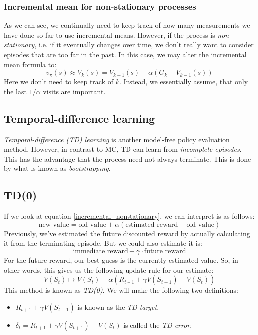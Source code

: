 \documentclass[12pt, a4paper]{article}
\numberwithin{equation}{section}
\begin{document}
\subsubsection{Incremental mean for non-stationary processes}
As we can see, we continually need to keep track of how many measurements we have done so far to use incremental means. However, if the process is \textit{non-stationary}, i.e. if it eventually changes over time, we don't really want to consider episodes that are too far in the past. In this case, we may alter the incremental mean formula to:
\begin{equation}
v_\pi(s)\approx V_k(s)=V_{k-1}(s)+\alpha(G_k-V_{k-1}(s))
\label{incremental_nonstationary}
\end{equation}
Here we don't need to keep track of $k$. Instead, we essentially assume, that only the last $1/\alpha$ visits are important.

\subsection{Temporal-difference learning}
\textit{Temporal-difference (TD) learning} is another model-free policy evaluation method. However, in contrast to MC, TD can learn from \textit{incomplete episodes}. This has the advantage that the process need not always terminate. This is done by what is known as \textit{bootstrapping}.

\subsection{TD(0)}
If we look at equation \ref{incremental_nonstationary}, we can interpret is as follows:
\begin{equation}
\textrm{new value}=\textrm{old value}+\alpha(\textrm{estimated reward}-\textrm{old value})
\end{equation}
Previously, we've estimated the future discounted reward by actually calculating it from the terminating episode. But we could also estimate it is:
\begin{equation}
\textrm{immediate reward}+\gamma\cdot\textrm{future reward}
\end{equation}
For the future reward, our best guess is the currently estimated value. So, in other words, this gives us the following update rule for our estimate:
\begin{equation}
V(S_t)\mapsto V(S_t)+\alpha(R_{t+1}+\gamma V(S_{t+1})-V(S_t)) 
\end{equation}
This method is known as \textit{TD(0)}. We will make the following two definitions:
\begin{itemize}
\item $R_{t+1}+\gamma V(S_{t+1})$ is known as the \textit{TD target}.
\item $\delta_t=R_{t+1}+\gamma V(S_{t+1})-V(S_t)$ is called the \textit{TD error}.
\end{itemize}
\end{document}
